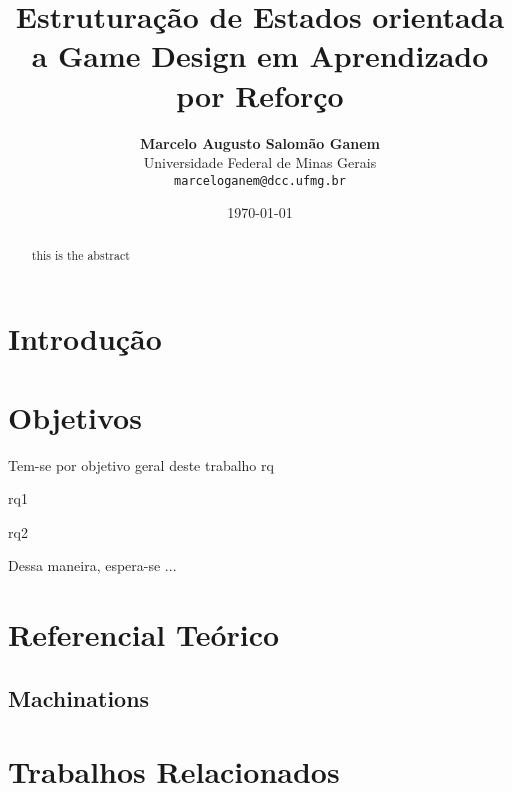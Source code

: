 \documentclass[10pt,a4paper]{article}
\title{Estruturação de Estados orientada a Game Design em Aprendizado por Reforço}
\author{{\bfseries Marcelo Augusto Salomão Ganem }\\ Universidade Federal de Minas Gerais\\
\texttt{marceloganem@dcc.ufmg.br}
}
\date{\today}
\begin{document}
\makeatletter

\twocolumn
\maketitle
\begin{abstract}
    this is the abstract
\end{abstract}


\section{Introdução}
\label{introduction}

\section{Objetivos}
\label{goals}

Tem-se por objetivo geral deste trabalho rq

\begin{outline}

    \1 rq1

    \1 rq2

\end{outline}

Dessa maneira, espera-se ...

\section{Referencial Teórico}
\label{bw}

\subsection{Machinations}
\label{bw:machinations}

\section{Trabalhos Relacionados}
\label{rw}
\end{document}
